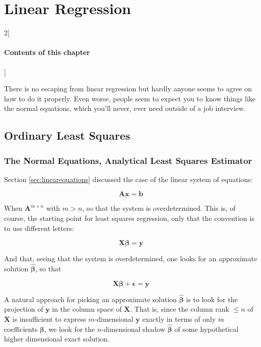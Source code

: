 \chapter{Linear Regression}
\label{chap:linearregression}

\begin{multicols}{2}[\subsubsection*{Contents of this chapter}]
\end{multicols}

There is no escaping from linear regression but hardly anyone seems to agree on how to do it properly. Even worse, people seem to expect you to know things like the normal equations, which you'll never, ever need outside of a job interview. 


\section{Ordinary Least Squares}

\subsection{The Normal Equations, Analytical Least Squares Estimator}
Section \ref{sec:linearequations} discussed the case of the linear system of equations:

\begin{equation}
\mathbf{A}\mathbf{x} = \mathbf{b}
\end{equation}


When $\mathbf{A}^{m\times n}$ with $m>n$, so that the system is overdetermined. This is, of course, the starting point for least squares regression, only that the convention is to use different letters:

\begin{equation}
\mathbf{X}\mathbf{\beta} = \mathbf{y}
\end{equation}

And that, seeing that the system is overdetermined, one looks for an approximate solution $\mathbf{\hat{\beta}}$, so that 

\begin{equation}
\mathbf{X}\mathbf{\beta} + \mathbf{\epsilon} = \mathbf{y}
\end{equation}


A natural approach for picking an approximate solution $\mathbf{\hat{\beta}}$ is to look for the projection of $\mathbf{y}$ in the column space of $\mathbf{X}$. That is, since the column rank $\leq n$ of $\mathbf{X}$ is insufficient to express $m$-dimensional $\mathbf{y}$ exactly in terms of only $m$ coefficients $\mathbf{\beta}$, we look for the $n$-dimensional shadow $\mathbf{\hat{\beta}}$ of some hypothetical higher dimensional exact solution. 

